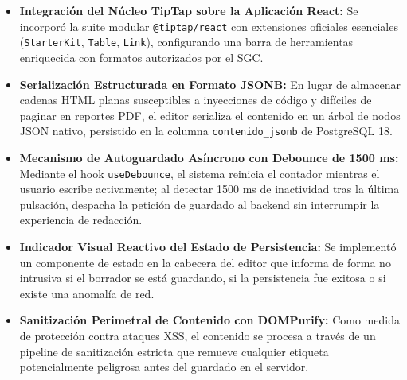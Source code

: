 \documentclass[12pt,a4paper]{article}
\begin{document}
\begin{itemize}[leftmargin=1.5em, itemsep=4pt]
    \item \textbf{Integración del Núcleo TipTap sobre la Aplicación React:} Se incorporó la suite modular \texttt{@tiptap/\allowbreak  react} con extensiones oficiales esenciales (\texttt{StarterKit}, \texttt{Table}, \texttt{Link}), configurando una barra de herramientas enriquecida con formatos autorizados por el SGC.
    \item \textbf{Serialización Estructurada en Formato JSONB:} En lugar de almacenar cadenas HTML planas susceptibles a inyecciones de código y difíciles de paginar en reportes PDF, el editor serializa el contenido en un árbol de nodos JSON nativo, persistido en la columna \texttt{contenido\_\allowbreak  jsonb} de PostgreSQL 18.
    \item \textbf{Mecanismo de Autoguardado Asíncrono con Debounce de 1500 ms:} Mediante el hook \texttt{useDebounce}, el sistema reinicia el contador mientras el usuario escribe activamente; al detectar 1500 ms de inactividad tras la última pulsación, despacha la petición de guardado al backend sin interrumpir la experiencia de redacción.
    \item \textbf{Indicador Visual Reactivo del Estado de Persistencia:} Se implementó un componente de estado en la cabecera del editor que informa de forma no intrusiva si el borrador se está guardando, si la persistencia fue exitosa o si existe una anomalía de red.
    \item \textbf{Sanitización Perimetral de Contenido con DOMPurify:} Como medida de protección contra ataques XSS, el contenido se procesa a través de un pipeline de sanitización estricta que remueve cualquier etiqueta potencialmente peligrosa antes del guardado en el servidor.
\end{itemize}
\end{document}
